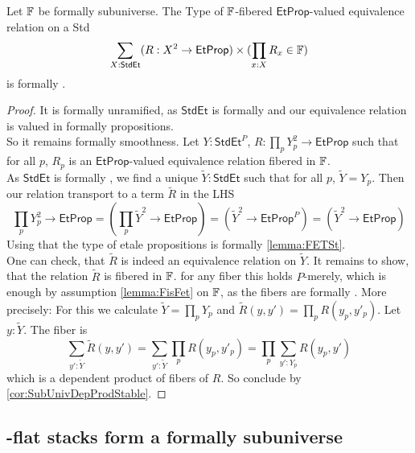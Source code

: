 \begin{lemma}{\label{lemma:EqRelSmooth}}
	Let $\mathbb{F}$ be formally \etale subuniverse. 
	The Type of $\mathbb{F}$-fibered  $\mathsf{EtProp}$-valued equivalence relation on a Std\etale 
	\[\sum_{X: \mathsf{StdEt}} (R : X^2 \to \mathsf{EtProp}) \times (\prod_{x : X} R_x \in \mathbb{F}) \]
	is formally \etale.
\end{lemma}
\begin{proof}
	It is formally unramified, as  $\mathsf{StdEt}$ is formally \etale and our equivalence relation is valued in formally \etale propositions. \\
	So it remains formally smoothness. 
	Let $Y : \mathsf{StdEt}^P$, $R : \prod_p Y_p^2 \to \mathsf{EtProp}$ such that for all $p$,  $R_p$ is an $\mathsf{EtProp}$-valued equivalence relation fibered in $\mathbb{F}$. \\
	As $\mathsf{StdEt}$ is formally \etale, we find a unique $\tilde Y : \mathsf{StdEt}$ such that for all $p$, $\tilde Y = Y_p$. Then our relation transport to a term $\tilde R$ in the LHS
	\[
	\prod_p Y_p^2 \to \mathsf{EtProp} = (\prod_p \tilde Y^2 \to \mathsf{EtProp}) = (\tilde Y^2 \to \mathsf{EtProp}^P) = (\tilde Y^2 \to \mathsf{EtProp})
	\]
	Using that the type of etale propositions is formally \etale \ref{lemma:FETSt}. \\
	One  can check, that $\tilde R$ is indeed an equivalence relation on $\tilde Y$. It remains to show, that the relation $\tilde R$ is fibered in $\mathbb{F}$. for any fiber this holds $P$-merely, which is enough by assumption \ref{lemma:FisFet} on $\mathbb{F}$, as the fibers are formally \etale .
	More precisely: For this we calculate $\tilde Y = \prod_p Y_p$ and $\tilde R(y,y') = \prod_p R(y_p,y'_p)$. Let $y : \tilde Y$. 
	The fiber is
	\[
	\sum_{y' : \tilde Y} \tilde R(y , y') = \sum_{y': \tilde Y} \prod_p R(y_p,y'_p) = \prod_p \sum_{y' : Y_p} R(y_p , y')
	\]
	which is a dependent product of fibers of $R$. So conclude by \ref{cor:SubUnivDepProdStable}.
\end{proof}
\subsection{\etale-flat stacks form a formally \etale subuniverse}

%


